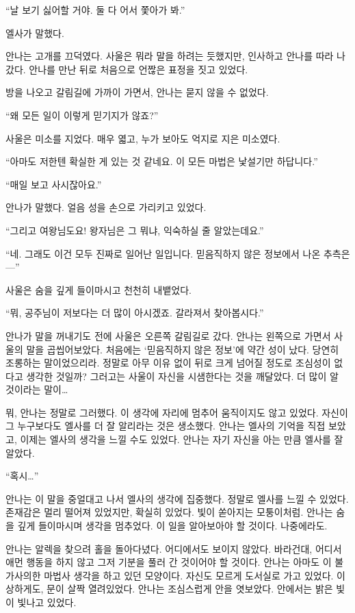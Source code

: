 ``날 보기 싫어할 거야. 둘 다 어서 쫓아가 봐.''

엘사가 말했다.

안나는 고개를 끄덕였다. 사울은 뭐라 말을 하려는 듯했지만, 인사하고 안나를 따라 나갔다. 안나를 만난 뒤로 처음으로 언짢은 표정을 짓고 있었다.

\textbreak

방을 나오고 갈림길에 가까이 가면서, 안나는 묻지 않을 수 없었다.

``왜 모든 일이 이렇게 믿기지가 않죠?''

사울은 미소를 지었다. 매우 엷고, 누가 보아도 억지로 지은 미소였다.

``아마도 저한텐 확실한 게 있는 것 같네요. 이 모든 마법은 낯설기만 하답니다.''

``매일 보고 사시잖아요.''

안나가 말했다. 얼음 성을 손으로 가리키고 있었다.

``그리고 여왕님도요! 왕자님은 그 뭐냐, 익숙하실 줄 알았는데요.''

``네. 그래도 이건 모두 진짜로 일어난 일입니다. 믿음직하지 않은 정보에서 나온 추측은—''

사울은 숨을 깊게 들이마시고 천천히 내뱉었다.

``뭐, 공주님이 저보다는 더 많이 아시겠죠. 갈라져서 찾아봅시다.''

안나가 말을 꺼내기도 전에 사울은 오른쪽 갈림길로 갔다. 안나는 왼쪽으로 가면서 사울의 말을 곱씹어보았다. 처음에는 `믿음직하지 않은 정보'에 약간 성이 났다. 당연히 조롱하는 말이었으리라. 정말로 아무 이유 없이 뒤로 크게 넘어질 정도로 조심성이 없다고 생각한 것일까? 그러고는 사울이 자신을 시샘한다는 것을 깨달았다. 더 많이 알 것이라는 말이\ldots

뭐, 안나는 정말로 그러했다. 이 생각에 자리에 멈추어 움직이지도 않고 있었다. 자신이 그 누구보다도 엘사를 더 잘 알리라는 것은 생소했다. 안나는 엘사의 기억을 직접 보았고, 이제는 엘사의 생각을 느낄 수도 있었다. 안나는 자기 자신을 아는 만큼 엘사를 잘 알았다.

``혹시\ldots''

안나는 이 말을 중얼대고 나서 엘사의 생각에 집중했다. 정말로 엘사를 느낄 수 있었다. 존재감은 멀리 떨어져 있었지만, 확실히 있었다. 빛이 쏟아지는 모퉁이처럼. 안나는 숨을 깊게 들이마시며 생각을 멈추었다. 이 일을 알아보아야 할 것이다. 나중에라도.

안나는 알렉을 찾으려 홀을 돌아다녔다. 어디에서도 보이지 않았다. 바라건대, 어디서 애먼 행동을 하지 않고 그저 기분을 풀러 간 것이어야 할 것이다. 안나는 아마도 이 불가사의한 마법사 생각을 하고 있던 모양이다. 자신도 모르게 도서실로 가고 있었다. 이상하게도, 문이 살짝 열려있었다. 안나는 조심스럽게 안을 엿보았다. 안에서는 밝은 빛이 빛나고 있었다.

